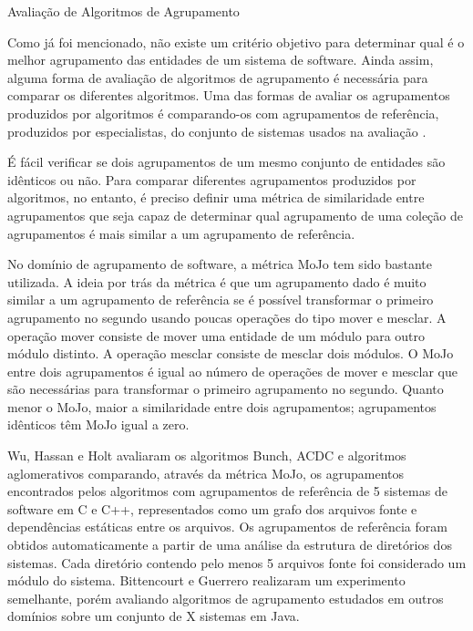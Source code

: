 \begin{section}{Avaliação de Algoritmos de Agrupamento}

Como já foi mencionado, não existe um critério objetivo para determinar qual é o melhor agrupamento das entidades de um sistema de software. Ainda assim, alguma forma de avaliação de algoritmos de agrupamento é necessária para comparar os diferentes algoritmos. Uma das formas de avaliar os agrupamentos produzidos por algoritmos é comparando-os com agrupamentos de referência, produzidos por especialistas, do conjunto de sistemas usados na avaliação \cite{Koschke2000}.

É fácil verificar se dois agrupamentos de um mesmo conjunto de entidades são idênticos ou não. Para comparar diferentes agrupamentos produzidos por algoritmos, no entanto, é preciso definir uma métrica de similaridade entre agrupamentos que seja capaz de determinar qual agrupamento de uma coleção de agrupamentos é mais similar a um agrupamento de referência.

No domínio de agrupamento de software, a métrica MoJo \cite{Tzerpos1999} tem sido bastante utilizada. A ideia por trás da métrica é que um agrupamento dado é muito similar a um agrupamento de referência se é possível transformar o primeiro agrupamento no segundo usando poucas operações do tipo mover e mesclar. A operação mover consiste de mover uma entidade de um módulo para outro módulo distinto. A operação mesclar consiste de mesclar dois módulos. O MoJo entre  dois agrupamentos é igual ao número de operações de mover e mesclar que são necessárias para transformar o primeiro agrupamento no segundo. Quanto menor o MoJo, maior a similaridade entre dois agrupamentos; agrupamentos idênticos têm MoJo igual a zero.


Wu, Hassan e Holt \cite{Wu2005} avaliaram os algoritmos Bunch, ACDC e algoritmos aglomerativos comparando, através da métrica MoJo, os agrupamentos encontrados pelos algoritmos com agrupamentos de referência de 5 sistemas de software em C e C++, representados como um grafo dos arquivos fonte e dependências estáticas entre os arquivos. Os agrupamentos de referência foram obtidos automaticamente a partir de uma análise da estrutura de diretórios dos sistemas. Cada diretório contendo pelo menos 5 arquivos fonte foi considerado um módulo do sistema. Bittencourt e Guerrero \cite{Bittencourt2009} realizaram um experimento semelhante, porém avaliando algoritmos de agrupamento estudados em outros domínios sobre um conjunto de X sistemas em Java.

\end{section}


